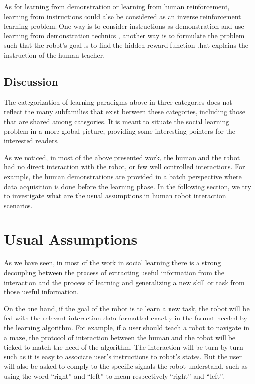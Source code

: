 As for learning from demonstration or learning from human reinforcement, learning from instructions could also be considered as an inverse reinforcement learning problem. One way is to consider instructions as demonstration and use learning from demonstration technics , another way is to formulate the problem such that the robot's goal is to find the hidden reward function that explains the instruction of the human teacher.

\subsection{Discussion}

The categorization of learning paradigms above in three categories does not reflect the many subfamilies that exist between these categories, including those that are shared among categories. It is meant to situate the social learning problem in a more global picture, providing some interesting pointers for the interested readers. 

As we noticed, in most of the above presented work, the human and the robot had no direct interaction with the robot, or few well controlled interactions. For example, the human demonstrations are provided in a batch perspective where data acquisition is done
before the learning phase. In the following section, we try to investigate what are the usual assumptions in human robot interaction scenarios.

\section{Usual Assumptions}

As we have seen, in most of the work in social learning there is a strong decoupling between the process of extracting useful information from the interaction and the process of learning and generalizing a new skill or task from those useful information.

On the one hand, if the goal of the robot is to learn a new task, the robot will be fed with the relevant interaction data formatted exactly in the format needed by the learning algorithm. For example, if a user should teach a robot to navigate in a maze, the protocol of interaction between the human and the robot will be ticked to match the need of the algorithm. The interaction will be turn by turn such as it is easy to associate user's instructions to robot's states. But the user will also be asked to comply to the specific signals the robot understand, such as using the word ``right'' and ``left'' to mean respectively ``right'' and ``left''.


